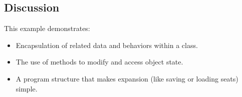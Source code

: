 \subsection*{Discussion}
This example demonstrates:
\begin{itemize}
    \item Encapsulation of related data and behaviors within a class.
    \item The use of methods to modify and access object state.
    \item A program structure that makes expansion (like saving or loading seats) simple.
\end{itemize}


